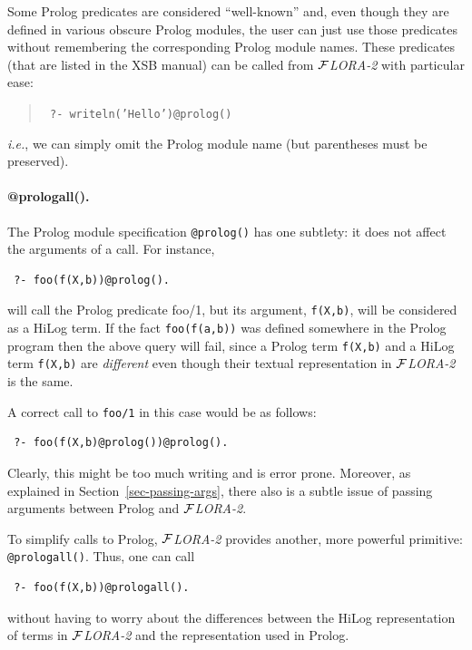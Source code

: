 \documentclass[11pt]{article}
\newcommand{\FLORA}{{\mbox{${\cal F}${\small\it LORA}\rm\emph{-2}}}\xspace}
\begin{document}
Some Prolog predicates are considered ``well-known'' and, even though they
are defined in various obscure Prolog modules, the user can just use those
predicates without remembering the corresponding Prolog module names. These
predicates (that are listed in the XSB manual) can be called from \FLORA
with particular ease:
\begin{quote}
 \tt
 ?- writeln('Hello')@prolog()
\end{quote}
{\it i.e.}, we can simply omit the Prolog module name (but parentheses must be
preserved). 

\paragraph{@prologall().}
The Prolog module specification {\tt @prolog()} has one subtlety: it does
not affect the arguments of a call. For instance, 
\begin{verbatim}
 ?- foo(f(X,b))@prolog().  
\end{verbatim}
will call the Prolog predicate foo/1, but its argument, {\tt f(X,b)}, will
be considered as a HiLog term. If the fact {\tt foo(f(a,b))} 
was defined somewhere in the Prolog program then the above query will fail,
since a Prolog term {\tt f(X,b)} and a HiLog term {\tt f(X,b)} are
\emph{different} even though their textual representation in \FLORA is the
same.

A correct call to {\tt foo/1} in this case would be as follows:
\begin{verbatim}
 ?- foo(f(X,b)@prolog())@prolog().
\end{verbatim}
Clearly, this might be too much writing and is error prone. Moreover, as
explained in Section~\ref{sec-passing-args}, there also is a subtle issue of
passing arguments between Prolog and \FLORA.

To simplify calls to Prolog, \FLORA provides another, more powerful
primitive: {\tt @prologall()}. Thus, one can call
\begin{verbatim}
 ?- foo(f(X,b))@prologall().  
\end{verbatim}
without having to worry about the differences between the HiLog
representation of terms in \FLORA and the representation used in Prolog.
\end{document}
